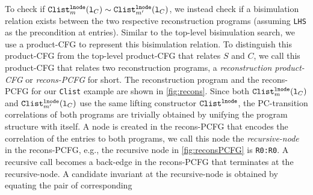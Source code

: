 To check if ${\tt Clist}_m^{{\tt lnode}}({\tt l}_C)
\sim{} {\tt Clist}_{m'}^{{\tt lnode}}({\tt l}_C)$, we instead
check if a bisimulation relation exists
between the two respective reconstruction programs (assuming {\tt LHS} as the precondition at entries).
Similar to the top-level bisimulation search, we use a product-CFG to represent this bisimulation relation.
To distinguish this product-CFG from the top-level product-CFG that relates $S$ and $C$, we call
this product-CFG that relates two reconstruction programs, a {\em reconstruction product-CFG}
or {\em recons-PCFG} for short.
The reconstruction
program and the recons-PCFG for our {\tt Clist} example
are shown in \cref{fig:recons}.
Since both ${\tt Clist}_m^{{\tt lnode}}({\tt l}_C)$
and ${\tt Clist}_{m'}^{{\tt lnode}}({\tt l}_C)$ use the same
lifting constructor ${\tt Clist}^{\tt lnode}$, the PC-transition correlations of both programs
are trivially obtained
by unifying the program structure with itself. A node
is created in the recons-PCFG that
encodes the correlation of the entries to both programs,
we call this node the {\em recursive-node} in the
recons-PCFG, e.g., the
recursive node in \cref{fig:reconsPCFG} is {\tt R0:R0}. A recursive
call becomes a back-edge in the recons-PCFG that terminates at the
recursive-node.
A candidate
invariant at the recursive-node
is obtained by equating the pair of corresponding

